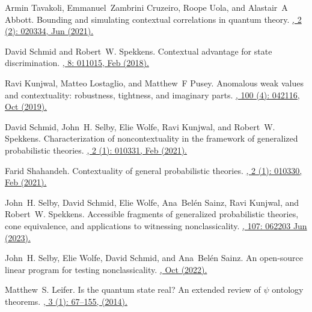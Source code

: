 \documentclass[a4paper,twocolumn,11pt,accepted=2024-01-17]{quantumarticle}
\begin{document}
\begin{thebibliography}{100}
Armin Tavakoli, Emmanuel~Zambrini Cruzeiro, Roope Uola, and Alastair~A Abbott.
\newblock Bounding and simulating contextual correlations in quantum theory.
\href{https://doi.org/10.1103/PRXQuantum.2.020334}{, 2 (2): 020334, Jun (2021).}

David Schmid and Robert~W. Spekkens.
\newblock Contextual advantage for state discrimination.
\href{https://doi.org/10.1103/PhysRevX.8.011015}{, 8: 011015, Feb (2018).}

Ravi Kunjwal, Matteo Lostaglio, and Matthew~F Pusey.
\newblock Anomalous weak values and contextuality: robustness, tightness, and
  imaginary parts.
\href{https://doi.org/10.1103/PhysRevA.100.042116}{, 100 (4): 042116, Oct (2019).}

David Schmid, John~H. Selby, Elie Wolfe, Ravi Kunjwal, and Robert~W. Spekkens.
\newblock Characterization of noncontextuality in the framework of generalized probabilistic theories.
\href{https://doi.org/10.1103/PRXQuantum.2.010331}{, 2 (1): 010331, Feb (2021).}

Farid Shahandeh.
\newblock Contextuality of general probabilistic theories.
\href{https://journals.aps.org/prxquantum/abstract/10.1103/PRXQuantum.2.010330}{, 2 (1): 010330, Feb (2021).}

John~H. Selby, David Schmid, Elie Wolfe, Ana~Bel{\'e}n Sainz, Ravi Kunjwal, and
  Robert~W. Spekkens.
\newblock Accessible fragments of generalized probabilistic theories, cone
  equivalence, and applications to witnessing nonclassicality.
\href{https://doi.org/10.1103/PhysRevA.107.062203}{, 107: 062203 Jun (2023).}

John~H. Selby, Elie Wolfe, David Schmid, and Ana~Bel{\'e}n Sainz.
\newblock An open-source linear program for testing nonclassicality.
\href{https://doi.org/10.48550/arXiv.2204.11905}{, Oct (2022).}

Matthew~S. Leifer.
\newblock Is the quantum state real? {A}n extended review of $\psi$ ontology theorems.
\href{https://doi.org/10.12743/quanta.v3i1.22}{, 3 (1): 67--155, (2014).}


\end{thebibliography}
\end{document}
